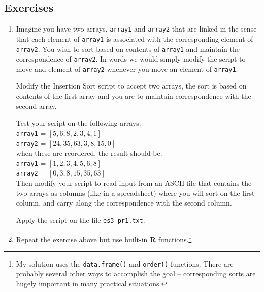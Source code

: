 \subsection{Exercises}
\begin{enumerate}
\item Imagine you have two arrays, \texttt{array1} and \texttt{array2} that are linked in the sense that each element of \texttt{array1} is associated with the corresponding element of \texttt{array2}.  You wish to sort based on contents of \texttt{array1} and maintain the correspondence of \texttt{array2}.  In words we would simply modify the script to move and element of \texttt{array2} whenever you move an element of \texttt{array1}.

Modify the Insertion Sort script to accept two arrays, the sort is based on contents of the first array and you are to maintain correspondence with the second array.

Test your script on the following arrays:\\
\texttt{array1} = $[5,6,8,2,3,4,1]$\\
\texttt{array2} = $[24,35,63,3,8,15,0]$\\

when these are reordered, the result should be: \\
\texttt{array1} = $[1,2,3,4,5,6,8]$\\
\texttt{array2} = $[0,3,8,15,35,63]$\\

Then modify your script to read input from an ASCII file that contains the two arrays as columns (like in a spreadsheet) where you will sort on the first column, and carry along the correspondence with the second column.

Apply the script on the file \texttt{es3-pr1.txt}.

\item Repeat the exercise above but use built-in \textbf{R} functions.\footnote{My solution uses the \texttt{data.frame()} and \texttt{order()} functions.  There are probably several other ways to accomplish the goal -- corresponding sorts are hugely important in many practical situations.}   
\end{enumerate}


